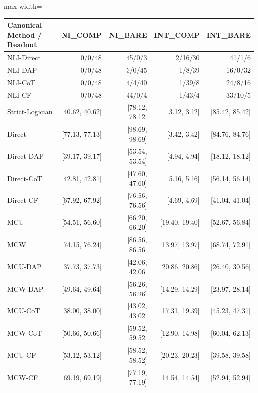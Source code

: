 \documentclass[11pt,a4paper]{article}
\begin{document}
\begin{center}\begingroup\small\setlength{\tabcolsep}{4.5pt}\renewcommand{\arraystretch}{1.12}\begin{adjustbox}{max width=\textwidth}\begin{tabular}{lrrrr}\toprule
\textbf{Canonical Method / Readout} & \textbf{NI\_\allowbreak{}COMP} & \textbf{NI\_\allowbreak{}BARE} & \textbf{INT\_\allowbreak{}COMP} & \textbf{INT\_\allowbreak{}BARE} \\ \midrule
NLI-Direct & 0/0/48 & 45/0/3 & 2/16/30 & 41/1/6 \\
NLI-DAP & 0/0/48 & 3/0/45 & 1/8/39 & 16/0/32 \\
NLI-CoT & 0/0/48 & 4/4/40 & 1/39/8 & 24/8/16 \\
NLI-CF & 0/0/48 & 44/0/4 & 1/43/4 & 33/10/5 \\
Strict-Logician & [40.62, 40.62] & [78.12, 78.12] & [3.12, 3.12] & [85.42, 85.42] \\
Direct & [77.13, 77.13] & [98.69, 98.69] & [3.42, 3.42] & [84.76, 84.76] \\
Direct-DAP & [39.17, 39.17] & [53.54, 53.54] & [4.94, 4.94] & [18.12, 18.12] \\
Direct-CoT & [42.81, 42.81] & [47.60, 47.60] & [5.16, 5.16] & [56.14, 56.14] \\
Direct-CF & [67.92, 67.92] & [76.56, 76.56] & [4.69, 4.69] & [41.04, 41.04] \\
MCU & [54.51, 56.60] & [66.20, 66.20] & [19.40, 19.40] & [52.67, 56.84] \\
MCW & [74.15, 76.24] & [86.56, 86.56] & [13.97, 13.97] & [68.74, 72.91] \\
MCU-DAP & [37.73, 37.73] & [42.06, 42.06] & [20.86, 20.86] & [26.40, 30.56] \\
MCW-DAP & [49.64, 49.64] & [56.26, 56.26] & [14.29, 14.29] & [23.97, 28.14] \\
MCU-CoT & [38.00, 38.00] & [43.02, 43.02] & [17.31, 19.39] & [45.23, 47.31] \\
MCW-CoT & [50.66, 50.66] & [59.52, 59.52] & [12.90, 14.98] & [60.04, 62.13] \\
MCU-CF & [53.12, 53.12] & [58.52, 58.52] & [20.23, 20.23] & [39.58, 39.58] \\
MCW-CF & [69.19, 69.19] & [77.19, 77.19] & [14.54, 14.54] & [52.94, 52.94] \\
\bottomrule\end{tabular}\end{adjustbox}\endgroup\end{center}
\end{document}
